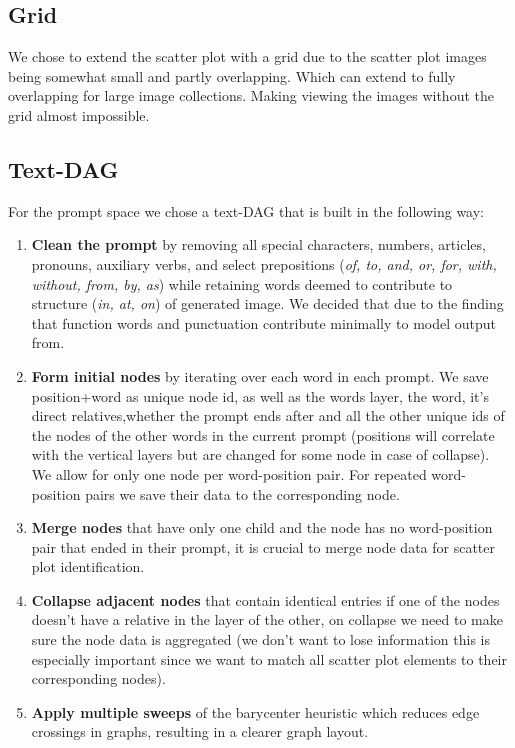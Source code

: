 \documentclass[
  a4paper,  %
  twoside,  %
  bibliography=totoc,
  headsepline,
  cleardoublepage=empty,
  parskip=half,
  draft=false
]{scrbook}
\begin{document}
\subsection{Grid}
We chose to extend the scatter plot with a grid due to the scatter plot images being somewhat small and partly overlapping. Which can extend to fully overlapping for large image collections. Making viewing the images without the grid almost impossible.
\subsection{Text-DAG}
For the prompt space we chose a text-DAG that is built in the following way: 
\begin{enumerate}
	\item \textbf{Clean the prompt} by removing all special characters, numbers, articles, pronouns, auxiliary verbs, and select prepositions (\textit{of, to, and, or, for, with, without, from, by, as}) while retaining words deemed to contribute to structure (\textit{in, at, on}) of generated image. We decided that due to the finding that function words and punctuation contribute minimally to model output from\cite{liu2022design}.
	
	\item \textbf{Form initial nodes} by iterating over each word in each prompt. We save position+word as unique node id, as well as the words layer, the word, it's direct relatives,whether the prompt ends after and all the other unique ids of the nodes of the other words in the current prompt (positions will correlate with the vertical layers but are changed for some node in case of collapse). We allow for only one node per word-position pair. For repeated word-position pairs we save their data to the corresponding node. 
	
	\item \textbf{Merge nodes} that have only one child and the node has no word-position pair that ended in their prompt, it is crucial to merge node data for scatter plot identification.
	
	\item \textbf{Collapse adjacent nodes} that contain identical entries if one of the nodes doesn't have a relative in the layer of the other, on collapse we need to make sure the node data is aggregated (we don't want to lose information this is especially important since we want to match all scatter plot elements to their corresponding nodes).
	
	\item \textbf{Apply multiple sweeps} of the barycenter heuristic which reduces edge crossings in graphs, resulting in a clearer graph layout.
\end{enumerate}
\end{document}
